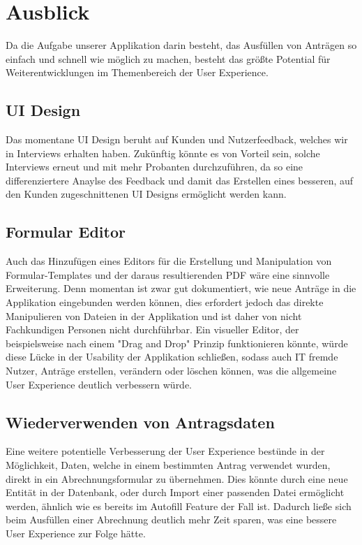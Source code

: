\chapter{Ausblick}\label{ch:ausblick}

Da die Aufgabe unserer Applikation darin besteht, das Ausfüllen von Anträgen so einfach 
und schnell wie möglich zu machen, besteht das größte Potential für Weiterentwicklungen
im Themenbereich der User Experience.

\section{\ac{UI} Design}\label{sec: ui design}
Das momentane \ac{UI} Design beruht auf Kunden und Nutzerfeedback, welches wir in 
Interviews erhalten haben. Zukünftig könnte es von Vorteil sein, solche Interviews 
erneut und mit mehr Probanten durchzuführen, da so eine differenziertere Anaylse
des Feedback und damit das Erstellen eines besseren, auf den Kunden zugeschnittenen \ac{UI} 
Designs ermöglicht werden kann.%

\section{Formular Editor}\label{sec: formular editor}
Auch das Hinzufügen eines Editors für die Erstellung und Manipulation von 
Formular-Templates und der daraus resultierenden PDF wäre eine sinnvolle Erweiterung. Denn 
momentan ist zwar gut dokumentiert, wie neue Anträge in die Applikation eingebunden werden 
können, dies erfordert jedoch das direkte Manipulieren von Dateien in der Applikation 
und ist daher von nicht Fachkundigen Personen nicht durchführbar. Ein visueller Editor, der 
beispielsweise nach einem "Drag and Drop" Prinzip funktionieren könnte, würde diese Lücke 
in der Usability der Applikation schließen, sodass auch IT fremde Nutzer, Anträge 
erstellen, verändern oder löschen können, was die allgemeine User Experience deutlich 
verbessern würde.

\section{Wiederverwenden von Antragsdaten}\label{sec: wiederverwenden von Antragsdaten}
Eine weitere potentielle Verbesserung der User Experience bestünde in der Möglichkeit, 
Daten, welche in einem bestimmten Antrag verwendet wurden, direkt in ein 
Abrechnungsformular zu übernehmen. Dies könnte durch eine neue Entität in der Datenbank, 
oder durch Import einer passenden Datei ermöglicht werden, ähnlich wie es bereits im 
Autofill Feature der Fall ist. Dadurch ließe sich beim Ausfüllen einer Abrechnung deutlich 
mehr Zeit sparen, was eine bessere User Experience zur Folge hätte.%

